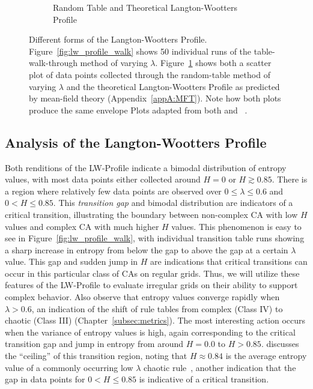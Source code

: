 \documentclass[a4paper,11pt]{report}
\begin{document}
\begin{figure}[htp]
\begin{subfigure}[t]{0.6\textwidth}
  \caption{Random Table and Theoretical Langton-Wootters Profile}
  \label{fig:lw_profile_rand}
  \end{subfigure}
\caption[The Langton-Wootters Profile]{
  Different forms of the Langton-Wootters Profile. Figure~\ref{fig:lw_profile_walk} shows 50 individual runs of the table-walk-through method of varying $\lambda$. Figure~\ref{fig:lw_profile_rand} shows both a scatter plot of data points collected through the random-table method of varying $\lambda$ and the theoretical Langton-Wootters Profile as predicted by mean-field theory (Appendix~\ref{appA:MFT}). Note how both plots produce the same envelope Plots adapted from both \citeauthor{la90} and \citeauthor{wo90}~\cite{la90,wo90}.
}
\label{fig:lw_profile}
\end{figure}

\subsection*{Analysis of the Langton-Wootters Profile}

Both renditions of the LW-Profile indicate a bimodal distribution of entropy values, with most data points either collected around $H=0$ or $H \gtrsim 0.85$. There is a region where relatively few data points are observed over $0 \le \lambda \le 0.6$ and $0 < H \le 0.85$. This \textit{transition gap} and bimodal distribution are indicators of a critical transition, illustrating the boundary between non-complex CA with low $H$ values and complex CA with much higher $H$ values. This phenomenon is easy to see in Figure~\ref{fig:lw_profile_walk}, with individual transition table runs showing a sharp increase in entropy from below the gap to above the gap at a certain $\lambda$ value. This gap and sudden jump in $H$ are indications that critical transitions can occur in this particular class of CAs on regular grids. Thus, we will utilize these features of the LW-Profile to evaluate irregular grids on their ability to support complex behavior. 
Also observe that entropy values converge rapidly when $\lambda > 0.6$, an indication of the shift of rule tables from complex (Class IV) to chaotic (Class III) (Chapter~\ref{subsec:metrics}). The most interesting action occurs when the variance of entropy values is high, again corresponding to the critical transition gap and jump in entropy from around $H=0.0$ to $H > 0.85$. \citeauthor{la90} discusses the ``ceiling'' of this transition region, noting that $H \approx 0.84$ is the average entropy value of a commonly occurring low $\lambda$ chaotic rule~\cite{la90}, another indication that the gap in data points for $0 < H \le 0.85$ is indicative of a critical transition.
\end{document}
